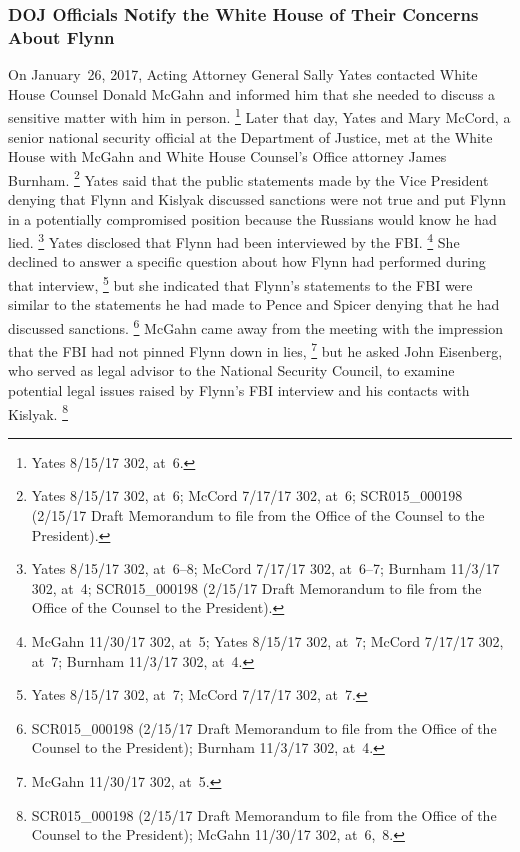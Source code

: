 \subsubsection{DOJ Officials Notify the White House of Their Concerns About Flynn}

On January~26, 2017, Acting Attorney General Sally Yates contacted White House Counsel Donald McGahn and informed him that she needed to discuss a sensitive matter with him in person.%
\footnote{Yates 8/15/17 302, at~6.}
Later that day, Yates and Mary McCord, a senior national security official at the Department of Justice, met at the White House with McGahn and White House Counsel's Office attorney James Burnham.%
\footnote{Yates 8/15/17 302, at~6;
McCord 7/17/17 302, at~6;
SCR015\_000198 (2/15/17 Draft Memorandum to file from the Office of the Counsel to the President).}
Yates said that the public statements made by the Vice President denying that Flynn and Kislyak discussed sanctions were not true and put Flynn in a potentially compromised position because the Russians would know he had lied.%
\footnote{Yates 8/15/17 302, at~6--8;
McCord 7/17/17 302, at~6--7;
Burnham 11/3/17 302, at~4;
SCR015\_000198 (2/15/17 Draft Memorandum to file from the Office of the Counsel to the President).}
Yates disclosed that Flynn had been interviewed by the FBI\null.%
\footnote{McGahn 11/30/17 302, at~5;
Yates 8/15/17 302, at~7;
McCord 7/17/17 302, at~7;
Burnham 11/3/17 302, at~4.}
She declined to answer a specific question about how Flynn had performed during that interview,%
\footnote{Yates 8/15/17 302, at~7;
McCord 7/17/17 302, at~7.}
but she indicated that Flynn's statements to the FBI were similar to the statements he had made to Pence and Spicer denying that he had discussed sanctions.%
\footnote{SCR015\_000198 (2/15/17 Draft Memorandum to file from the Office of the Counsel to the President);
Burnham 11/3/17 302, at~4.}
McGahn came away from the meeting with the impression that the FBI had not pinned Flynn down in lies,%
\footnote{McGahn 11/30/17 302, at~5.}
but he asked John Eisenberg, who served as legal advisor to the National Security Council, to examine potential legal issues raised by Flynn's FBI interview and his contacts with Kislyak.%
\footnote{SCR015\_000198 (2/15/17 Draft Memorandum to file from the Office of the Counsel to the President);
McGahn 11/30/17 302, at~6,~8.}


